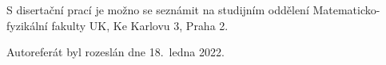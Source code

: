 \vspace{2mm}

\noindent
S disertační prací je možno se seznámit na studijním oddělení
Matematicko-fyzikální fakulty UK, Ke Karlovu 3, Praha 2.

\vspace{1mm}

\noindent
Autoreferát byl rozeslán dne 18.\ ledna 2022.

\clearpage

\normalsize %

\tableofcontents %
\thispagestyle{empty}










\cleardoublepage

\pagestyle{plain}
\setcounter{page}{1}
